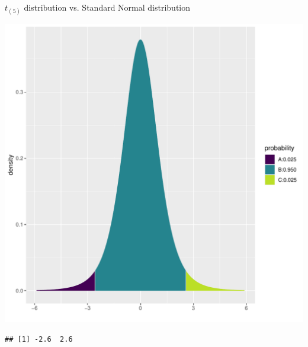\documentclass[10pt,handout]{beamer}\usepackage[]{graphicx}\usepackage[]{color}
\makeatletter
\def\maxwidth{ %
  \ifdim\Gin@nat@width>\linewidth
    \linewidth
  \else
    \Gin@nat@width
  \fi
}
\newenvironment{kframe}{%
 \def\at@end@of@kframe{}%
 \ifinner\ifhmode%
  \def\at@end@of@kframe{\end{minipage}}%
  \begin{minipage}{\columnwidth}%
 \fi\fi%
 \def\FrameCommand##1{\hskip\@totalleftmargin \hskip-\fboxsep
 \colorbox{shadecolor}{##1}\hskip-\fboxsep
     \hskip-\linewidth \hskip-\@totalleftmargin \hskip\columnwidth}%
 \MakeFramed {\advance\hsize-\width
   \@totalleftmargin\z@ \linewidth\hsize
   \@setminipage}}%
 {\par\unskip\endMakeFramed%
 \at@end@of@kframe}
\newenvironment{knitrout}{}{} %
\makeatother
\begin{document}
\begin{frame}[fragile]{$t_{(5)}$ distribution vs. Standard Normal distribution}
\begin{minipage}{0.5\textwidth}
\begin{knitrout}
{\centering \includegraphics[width=\maxwidth]{figure/unnamed-chunk-3-1} 

}


\begin{kframe}\begin{verbatim}
## [1] -2.6  2.6
\end{verbatim}
\end{kframe}
\end{knitrout}
	\end{minipage}
\end{frame}
\end{document}
